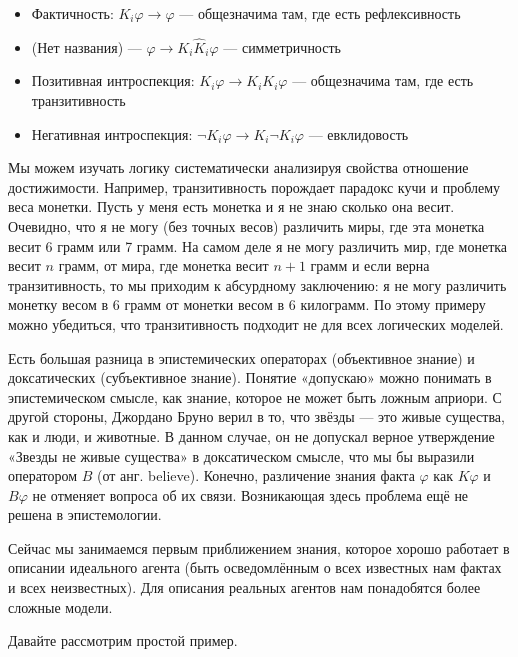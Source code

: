 \documentclass[openany]{book}
\theoremstyle{plain}
\theoremstyle{definition}
\begin{document}
\begin{itemize}
    \item Фактичность: \(K_i \varphi \to \varphi\) — общезначима там, где есть рефлексивность
    \item (Нет названия) — \(\varphi \to K_i \hat{K}_i \varphi\) — симметричность
    \item Позитивная интроспекция: \(K_i \varphi \to K_i K_i \varphi\) — общезначима там, где есть транзитивность
    \item Негативная интроспекция: \(\neg K_i \varphi \to K_i \neg K_i \varphi\) — евклидовость
\end{itemize}

Мы можем изучать логику систематически анализируя свойства отношение достижимости. Например, транзитивность порождает парадокс кучи и проблему веса монетки. Пусть у меня есть монетка и я не знаю сколько она весит. Очевидно, что я не могу (без точных весов) различить миры, где эта монетка весит 6 грамм или 7 грамм. На самом деле я не могу различить мир, где монетка весит \(n\) грамм, от мира, где монетка весит \(n+1\) грамм и если верна транзитивность, то мы приходим к абсурдному заключению: я не могу различить монетку весом в 6 грамм от монетки весом в 6 килограмм. По этому примеру можно убедиться, что транзитивность подходит не для всех логических моделей.

Есть большая разница в эпистемических операторах (объективное знание) и доксатических (субъективное знание). Понятие «допускаю» можно понимать в эпистемическом смысле, как знание, которое не может быть ложным априори. С другой стороны, Джордано Бруно верил в то, что звёзды — это живые существа, как и люди, и животные. В данном случае, он не допускал верное утверждение «Звезды не живые существа» в доксатическом смысле, что мы бы выразили оператором \(B\) (от анг. believe). Конечно, различение знания факта \(\varphi\) как \(K\varphi\) и \(B\varphi\) не отменяет вопроса об их связи. Возникающая здесь проблема ещё не решена в эпистемологии.

Сейчас мы занимаемся первым приближением знания, которое хорошо работает в описании идеального агента (быть осведомлённым о всех известных нам фактах и всех неизвестных). Для описания реальных агентов нам понадобятся более сложные модели.



Давайте рассмотрим простой пример.
\end{document}
